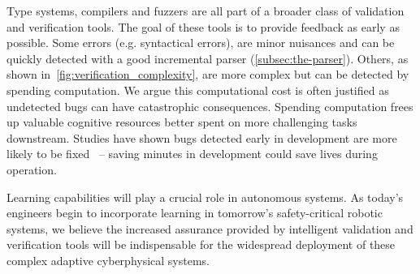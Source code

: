 Type systems, compilers and fuzzers are all part of a broader class of validation and verification tools. The goal of these tools is to provide feedback as early as possible. Some errors (e.g. syntactical errors), are minor nuisances and can be quickly detected with a good incremental parser (\autoref{subsec:the-parser}). Others, as shown in~\autoref{fig:verification_complexity}, are more complex but can be detected by spending computation. We argue this computational cost is often justified as undetected bugs can have catastrophic consequences. Spending computation frees up valuable cognitive resources better spent on more challenging tasks downstream. Studies have shown bugs detected early in development are more likely to be fixed~\citep{distefano2019scaling} -- saving minutes in development could save lives during operation.

Learning capabilities will play a crucial role in autonomous systems. As today's engineers begin to incorporate learning in tomorrow's safety-critical robotic systems, we believe the increased assurance provided by intelligent validation and verification tools will be indispensable for the widespread deployment of these complex adaptive cyberphysical systems.